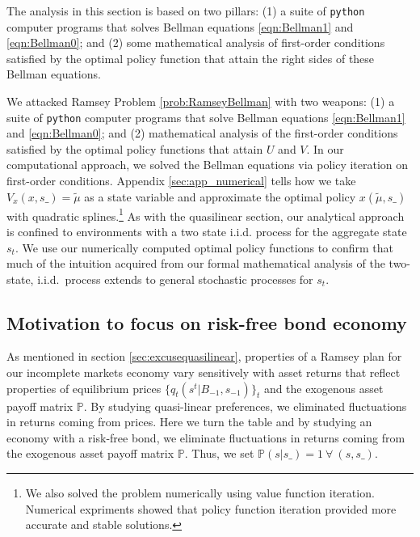 \documentclass[12pt]{article}
\newcommand{\tjs}[1]{\textcolor{red}{$^{\textrm{tjs}}${#1}}}
\begin{document}
The analysis in this section is based on two pillars: (1) a suite of \texttt{python} computer programs that solves Bellman equations
\eqref{eqn:Bellman1} and \eqref{eqn:Bellman0}; and (2) some mathematical analysis of first-order conditions satisfied by
the  optimal policy function that attain the right sides of these Bellman equations.

We attacked Ramsey  Problem \ref{prob:RamseyBellman} with two weapons: (1) a suite of \texttt{python} computer programs that solve Bellman equations \eqref{eqn:Bellman1} and \eqref{eqn:Bellman0};
and (2) mathematical analysis of the first-order conditions satisfied by the optimal policy functions that attain $U$ and $V$. In our computational approach,
we solved the Bellman equations via policy iteration on  first-order conditions.  Appendix \ref{sec:app_numerical} tells how we take $V_x(x,s\_) = \tilde{\mu}$ as a state variable
and approximate the optimal policy  $x(\tilde \mu,s\_)$ with quadratic splines.\footnote{We also solved the
problem numerically using value function iteration.  Numerical expriments showed that policy function iteration provided more accurate and stable solutions.}
As with the quasilinear section, our analytical approach is confined to environments with a two state i.i.d. process for  the aggregate state $s_t$.
We use our numerically computed optimal policy functions to confirm that much  of the  intuition  acquired from our formal mathematical analysis of the two-state, i.i.d.\ process
extends to  general stochastic processes for $s_t$.

\subsection{Motivation to focus on risk-free bond economy\label{sec:riskfreeonly}}

As mentioned in section \ref{sec:excusequasilinear},  properties of a Ramsey plan for our incomplete markets economy vary sensitively  with   asset returns that reflect
	properties of equilibrium prices $\{q_t(s^t|B_{-1},s_{-1})\}_t$ and the exogenous asset payoff matrix $\mathbb{P}$.  By studying
quasi-linear preferences, we eliminated fluctuations in returns coming from prices.  Here we turn the table and by studying an economy
with a risk-free bond, we eliminate fluctuations in returns coming from the exogenous asset payoff matrix $\mathbb{P}$.
Thus, we set $\mathbb{P}(s|s\_)=1 \ \forall \ (s,s\_)$.
\end{document}
